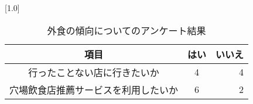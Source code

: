 \begin{table}[H]
\centering
\caption{外食の傾向についてのアンケート結果}
\label{table:questionnaire:tendency}
\small
\scalebox{0.7}[1.0]{
\begin{tabular}{|c|c|r|}
\hline
項目 & はい & いいえ \\ \hline
行ったことない店に行きたいか & 4 & 4 \\ \hline
穴場飲食店推薦サービスを利用したいか & 6 & 2 \\ \hline
\end{tabular}
}
\end{table}
